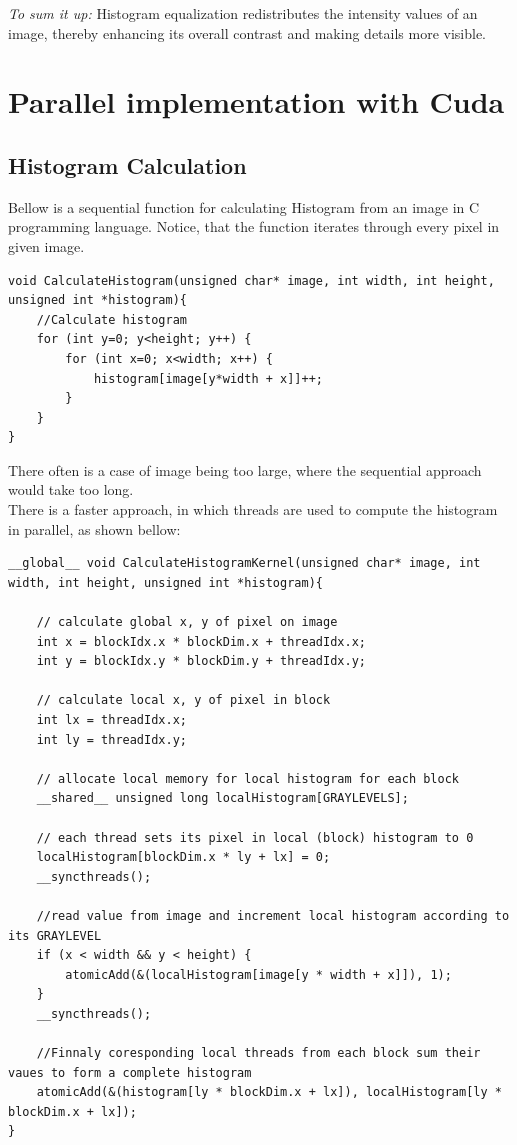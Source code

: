 \documentclass[10pt]{article}
\begin{document}
\emph{To sum it up:} Histogram equalization redistributes the intensity values of an image, thereby enhancing its overall contrast and making details more visible. 

\pagebreak

\section{Parallel implementation with Cuda}
\vspace{0.5cm}
\subsection{Histogram Calculation}
\vspace{0.3cm}

Bellow is a sequential function for calculating Histogram from an image in C programming language.
Notice, that the function iterates through every pixel in given image. 
\begin{lstlisting}[style=cppstyle]
void CalculateHistogram(unsigned char* image, int width, int height, unsigned int *histogram){
    //Calculate histogram
    for (int y=0; y<height; y++) {
        for (int x=0; x<width; x++) {
            histogram[image[y*width + x]]++;
        }
    }
}
\end{lstlisting}

There often is a case of image being too large, where the sequential approach would take too long.\\

There is a faster approach, in which threads are used to compute the histogram in parallel, as shown bellow:

\begin{lstlisting}[style=cppstyle]
__global__ void CalculateHistogramKernel(unsigned char* image, int width, int height, unsigned int *histogram){
   
    // calculate global x, y of pixel on image
    int x = blockIdx.x * blockDim.x + threadIdx.x;
    int y = blockIdx.y * blockDim.y + threadIdx.y;

    // calculate local x, y of pixel in block 
    int lx = threadIdx.x;
    int ly = threadIdx.y;

    // allocate local memory for local histogram for each block
    __shared__ unsigned long localHistogram[GRAYLEVELS];

    // each thread sets its pixel in local (block) histogram to 0 
    localHistogram[blockDim.x * ly + lx] = 0;
    __syncthreads();

    //read value from image and increment local histogram according to its GRAYLEVEL
    if (x < width && y < height) {
        atomicAdd(&(localHistogram[image[y * width + x]]), 1);
    }
    __syncthreads();

    //Finnaly coresponding local threads from each block sum their vaues to form a complete histogram
    atomicAdd(&(histogram[ly * blockDim.x + lx]), localHistogram[ly * blockDim.x + lx]);
}
\end{lstlisting}
\end{document}
